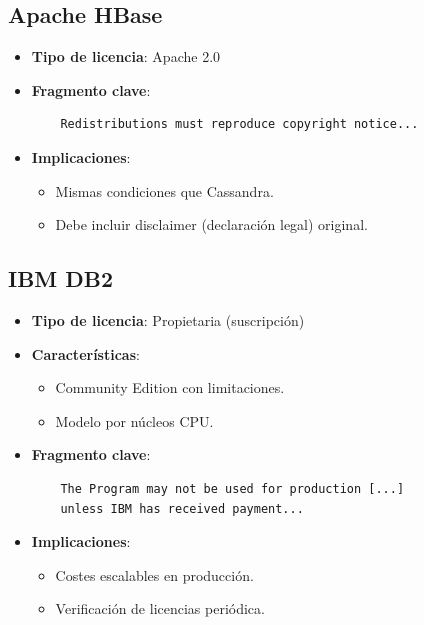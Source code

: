 \documentclass{article}
\begin{document}
\subsection{Apache HBase}
\begin{itemize}
    \item \textbf{Tipo de licencia}: Apache 2.0
    \item \textbf{Fragmento clave}:
    \begin{verbatim}
    Redistributions must reproduce copyright notice...
    \end{verbatim}
    \item \textbf{Implicaciones}:
    \begin{itemize}
        \item Mismas condiciones que Cassandra.
        \item Debe incluir disclaimer (declaración legal) original.
    \end{itemize}
\end{itemize}

\subsection{IBM DB2}
\begin{itemize}
    \item \textbf{Tipo de licencia}: Propietaria (suscripción)
    \item \textbf{Características}:
    \begin{itemize}
        \item Community Edition con limitaciones.
        \item Modelo por núcleos CPU.
    \end{itemize}
    \item \textbf{Fragmento clave}:
    \begin{verbatim}
    The Program may not be used for production [...] 
    unless IBM has received payment...
    \end{verbatim}
    \item \textbf{Implicaciones}:
    \begin{itemize}
        \item Costes escalables en producción.
        \item Verificación de licencias periódica.
    \end{itemize}
\end{itemize}
\end{document}
